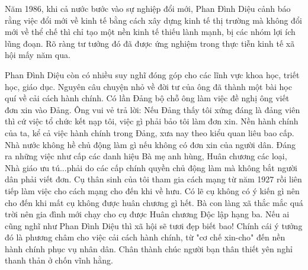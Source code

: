 Năm 1986, khi cả nước bước vào sự nghiệp đổi mới, Phan Đình Diệu cảnh báo rằng việc đổi mới về kinh tế bằng cách xây dựng kinh tế thị trường mà không đổi mới về thể chế thì chỉ tạo một nền kinh tế thiếu lành mạnh, bị các nhóm lợi ích lũng đoạn.
Rõ ràng tư tưởng đó đã được ứng nghiệm trong thực tiễn kinh tế xã hội mấy năm qua.

Phan Đình Diệu còn có nhiều suy nghĩ đóng góp cho các lĩnh vực khoa học, triết học, giáo  dục. Nguyên câu chuyện nhỏ về đời tư của ông đã thành một bài học  quí về cải cách hành chính. Có lần Đảng bộ chỗ ông làm việc đề nghị ông viết đơn xin vào Đảng. Ông vui vẻ trả lời: Nếu Đảng thấy tôi xứng đáng là đảng viên thì cứ việc tổ chức kết nạp tôi, việc gì phải bảo tôi làm đơn xin. Nền hành chính của ta, kể cả việc hành chính trong Đảng, xưa nay theo kiểu quan liêu bao cấp. Nhà nước không hề chủ động làm gì nếu không có đơn xin của người dân. Đáng ra những việc như cấp các danh hiệu Bà mẹ anh hùng, Huân chương các loại, Nhà giáo ưu tú...phải do các cấp chính quyền chủ động làm mà không bắt người dân phải viết đơn. Cụ thân sinh của tôi tham gia cách mạng từ năm 1927 rồi liên tiếp làm việc cho cách mạng cho đến khi về hưu. Có lẽ cụ không có ý kiến gì  nên cho đến khi mất cụ không được huân chương gì hết. Bà con làng xã thắc mắc quá trời nên gia đình mới chạy cho cụ được Huân chương Độc lập hạng ba. Nếu ai cũng nghĩ như Phan Đình Diệu thì xã hội sẽ tươi đẹp biết bao! Chính cái ý tưởng đó là phương châm cho việc cải cách hành chính, từ "cơ chế xin-cho" đến nền hành chính phục vụ nhân dân.
Chân thành chúc người bạn thân thiết yên nghỉ thanh thản ở chốn vĩnh hằng.